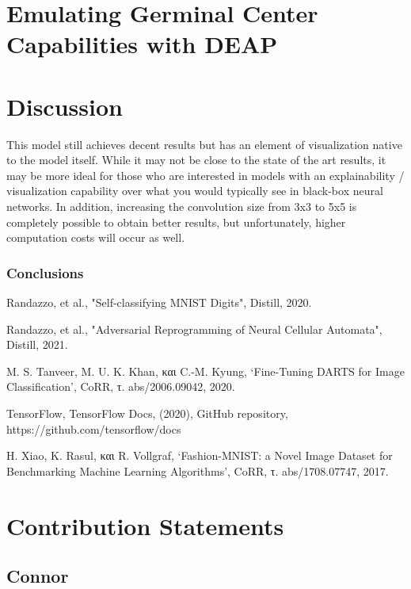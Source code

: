 \documentclass[conference]{IEEEtran}
\begin{document}
\section{Emulating Germinal Center Capabilities with DEAP}



\section{Discussion}

This model still achieves decent results but has an element of visualization native to the model itself. While it may not be close to the state of the art results, it may be more ideal for those who are interested in models with an explainability / visualization capability over what you would typically see in black-box neural networks. In addition, increasing the convolution size from 3x3 to 5x5 is completely possible to obtain better results, but unfortunately, higher computation costs will occur as well.

\subsubsection{Conclusions}


\begin{thebibliography}{00}

 Randazzo, et al., "Self-classifying MNIST Digits", Distill, 2020.

 Randazzo, et al., "Adversarial Reprogramming of Neural Cellular Automata", Distill, 2021.

 M. S. Tanveer, M. U. K. Khan, και C.-M. Kyung, ‘Fine-Tuning DARTS for Image Classification’, CoRR, τ. abs/2006.09042, 2020.

 TensorFlow, TensorFlow Docs, (2020), GitHub repository, https://github.com/tensorflow/docs

 H. Xiao, K. Rasul, και R. Vollgraf, ‘Fashion-MNIST: a Novel Image Dataset for Benchmarking Machine Learning Algorithms’, CoRR, τ. abs/1708.07747, 2017.
\end{thebibliography}

\section*{Contribution Statements}

\subsection{Connor}
\end{document}
